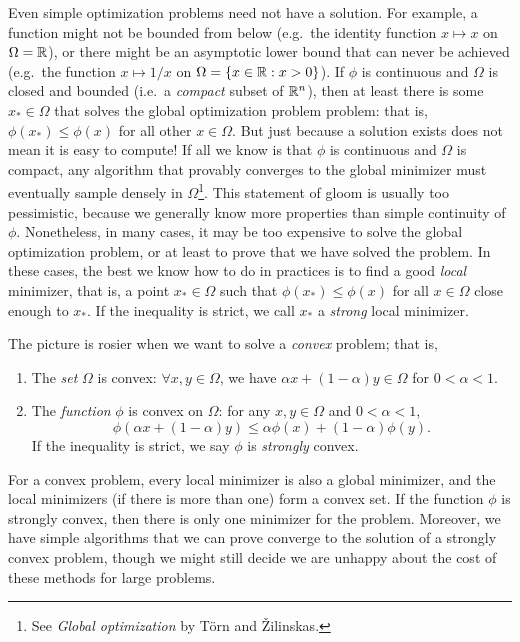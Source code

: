 \documentclass[12pt, leqno]{article} %
\begin{document}
Even simple optimization problems need not have a solution.
For example, a function might not be bounded from below (e.g.~the
identity function $x \mapsto x$ on $\Omega = \mathbb{R}$), or there might
be an asymptotic lower bound that can never be achieved (e.g.~the
function $x \mapsto 1/x$ on $\Omega = \{ x \in \mathbb{R} : x > 0 \}$).
If $\phi$ is continuous and $\Omega$ is closed and bounded (i.e.~a
{\em compact} subset of $\mathbb{R}^n$), then at least there is some
$x_* \in \Omega$ that solves the global optimization problem problem:
that is, $\phi(x_*) \leq \phi(x)$ for all other $x \in \Omega$.
But just because a solution exists does not mean it is easy to
compute!  If all we know is that $\phi$ is continuous and $\Omega$ is
compact, any algorithm that provably converges to the global minimizer
must eventually sample densely in $\Omega$\footnote{%
  See {\em Global optimization} by T{\"o}rn and {\v{Z}}ilinskas.
}.  This statement of gloom
is usually too pessimistic, because we generally know more properties
than simple continuity of $\phi$.  Nonetheless, in many cases,
it may be too expensive to solve the global optimization
problem, or at least to prove that we have solved the problem.
In these cases, the best we know how to do in practices is to find a
good {\em local} minimizer, that is, a point $x_* \in \Omega$ such that
$\phi(x_*) \leq \phi(x)$ for all $x \in \Omega$ close enough to $x_*$.
If the inequality is strict, we call $x_*$ a {\em strong} local
minimizer.

The picture is rosier when we want to solve a {\em convex} problem; that is,
\begin{enumerate}
\item The {\em set} $\Omega$ is convex: $\forall x, y \in \Omega$, 
  we have $\alpha x + (1-\alpha) y \in \Omega$ for $0 < \alpha < 1$.
\item The {\em function} $\phi$ is convex on $\Omega$:
  for any $x, y \in \Omega$ and $0 < \alpha < 1$,
  \[
    \phi\left( \alpha x + (1-\alpha) y\right) \leq
    \alpha \phi(x) + (1-\alpha) \phi(y).
  \]
  If the inequality is strict, we say $\phi$ is {\em strongly} convex.
\end{enumerate}
For a convex problem, every local minimizer is also a global
minimizer, and the local minimizers (if there is more than one) form a
convex set.  If the function $\phi$ is strongly convex, then there is
only one minimizer for the problem.  Moreover, we have simple
algorithms that we can prove converge to the solution of a strongly
convex problem, though we might still decide we are unhappy about the
cost of these methods for large problems.
\end{document}
